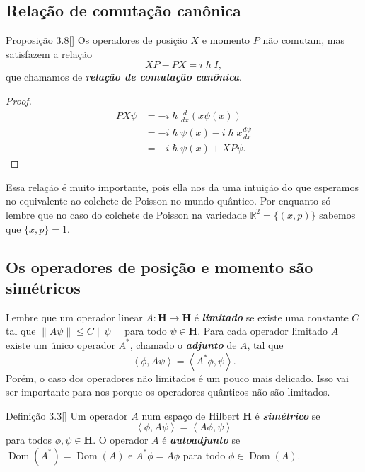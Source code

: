 \subsection{Relação de comutação canônica}

\begin{thing4}{Proposição 3.8}[\cite{hallq}]\leavevmode
Os operadores de posição  $X$ e momento $P$ não comutam, mas satisfazem a relação
\[XP-PX=i\hslash I,\]que chamamos de \textit{\textbf{relação de comutação canônica}}.
\end{thing4}

\begin{proof}\leavevmode
	\begin{align*}
		PX\psi&=-i\hslash\frac{d}{dx}(x\psi(x))\\
		&=-i\hslash\psi(x)-i\hslash x\frac{d\psi}{dx}\\
		&=-i\hslash\psi(x)+XP\psi.
	\end{align*}
\end{proof}
Essa relação é muito importante, pois ella nos da uma intuição do que esperamos no equivalente ao colchete de Poisson no mundo quântico. Por enquanto só lembre que no caso do colchete de Poisson na variedade $\mathbb{R}^{2}=\{(x,p)\}$ sabemos que $\{x,p\} =1$.

\subsection{Os operadores de posição e momento são simétricos}

Lembre que um operador linear $A:\mathbf{H}\to\mathbf{H}$ é \textit{\textbf{limitado}} se existe uma constante $C$ tal que $\|A\psi\|\leq C\|\psi\|$ para todo $\psi\in \mathbf{H}$. Para cada operador limitado $A$ existe um único operador $A^*$, chamado o \textit{\textbf{adjunto}} de $A$, tal que
\[\left<\phi,A\psi\right>=\left<A^*\phi,\psi\right>.\]
Porém, o caso dos operadores não limitados é um pouco mais delicado. Isso vai ser importante para nos porque os operadores quânticos não são limitados.

\iffalse
\begin{thing4}{Definição 3.3}[\cite{hallq}]\leavevmode
	Seja $A$ um operador não limitado num  espaço de hilbert $\mathbf{H}$. O \textit{\textbf{adjunto}} $A^*$ de $A$ se define como segue. Um vetor  $\phi \in \mathbf{H}$ pertence a $\operatorname{Dom}(A^*)$ se o j
\end{thing4}\fi

\begin{thing4}{Definição 3.3}[\cite{hallq}]\leavevmode
	Um operador $A$ num espaço de Hilbert $\mathbf{H}$ é \textit{\textbf{simétrico}} se
	\[\left<\phi,A\psi\right> =\left<A\phi,\psi\right> \]
	para todos $\phi,\psi \in \mathbf{H}$. O operador $A$  é \textit{\textbf{autoadjunto}} se  $\operatorname{Dom}(A^*)=\operatorname{Dom}(A)$ e $A^*\phi=A\phi$ para todo $\phi \in \operatorname{Dom}(A)$.
\end{thing4}

